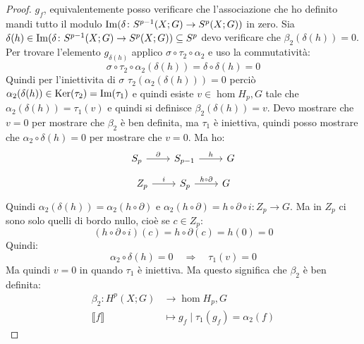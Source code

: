 \begin{proof}
  $ g_f $, equivalentemente posso verificare che l'associazione che ho definito
  mandi tutto il modulo $ \mathrm{Im}( \delta \colon S^{p-1}(X;G) \to S^p(X;G) ) $ in zero. Sia
  $ \delta (h) \in \mathrm{Im}( \delta \colon S^{p-1}(X;G) \to S^p(X;G) ) \subseteq S^p $ devo verificare che
  $ \beta_2(\delta(h)) = 0 $. Per trovare l'elemento $ g_{\delta(h)} $ applico $ \sigma \circ \tau_2 \circ \alpha_2 $
  e uso la commutatività:
  \[
    \sigma \circ \tau_2 \circ \alpha_2 (\delta(h)) = \delta \circ \delta (h) = 0
  \]
  Quindi per l'iniettivita di $ \sigma $ $ \tau_2(\alpha_2(\delta(h))) = 0 $ perciò
  $ \alpha_2(\delta(h)) \in \mathrm{Ker}( \tau_2) = \mathrm{Im}( \tau_1 ) $ e quindi esiste
  $ v \in \hom{H_p,G} $ tale che $ \alpha_2(\delta(h)) = \tau_1(v) $ e quindi si definisce
  $ \beta_2(\delta(h)) = v $. Devo mostrare che $ v = 0 $ per mostrare che
  $ \beta_2 $ è ben definita, ma $ \tau_1 $ è iniettiva, quindi posso mostrare che
  $ \alpha_2 \circ \delta (h) = 0 $ per mostrare che $ v = 0 $. Ma ho:
  \[
    \begin{tikzcd}
      S_p \rar{\partial} & S_{p-1} \rar{h} & G
    \end{tikzcd}
  \]
  \[
    \begin{tikzcd}
      Z_p \rar{i} & S_{p} \rar{h \circ \partial} & G
    \end{tikzcd}
  \]
  Quindi $ \alpha_2(\delta(h)) = \alpha_2(h \circ \partial) $ e $ \alpha_2(h \circ \partial) = h \circ \partial \circ i \colon Z_p \to G $.
  Ma in $ Z_p $ ci sono solo quelli di bordo nullo, cioè se $ c \in Z_p $:
  \[
    (h \circ \partial \circ i)(c) = h \circ \partial(c) = h(0) = 0
  \]
  Quindi:
  \[
    \alpha_2 \circ \delta(h) = 0 \quad \Rightarrow \quad \tau_1(v) = 0
  \]
  Ma quindi $ v = 0 $ in quando $ \tau_1 $ è iniettiva. Ma questo significa
  che $ \beta_2 $ è ben definita:
  \begin{align*}
    \beta_2 \colon H^p(X;G) & \to \hom{H_p,G} \\
    \llbracket f \rrbracket & \mapsto g_f \; | \; \tau_1(g_f) = \alpha_2(f)
  \end{align*}


\end{proof}

